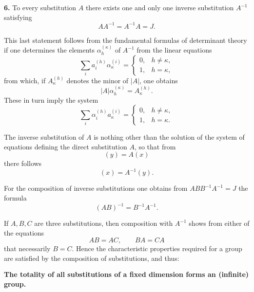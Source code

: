 \documentclass[11pt]{article}
\begin{document}
\medskip
\noindent\textbf{6.}
To every substitution \(A\) there exists one and only one inverse substitution \(A^{-1}\) satisfying
\[
AA^{-1}=A^{-1}A=J.
\tag{15}
\]

\medskip
This last statement follows from the fundamental formulas of determinant theory if one determines the elements \(\alpha^{(\kappa)}_h\) of \(A^{-1}\) from the linear equations
\[
\sum_i a^{(h)}_i\alpha^{(i)}_\kappa=
\begin{cases}
0,& h\ne \kappa,\\
1,& h=\kappa,
\end{cases}
\tag{16}
\]
from which, if \(A^{(h)}_\kappa\) denotes the minor of \(|A|\), one obtains
\[
|A|\alpha^{(\kappa)}_h=A^{(h)}_\kappa.
\tag{17}
\]
These in turn imply the system
\[
\sum_i \alpha^{(h)}_i a^{(i)}_\kappa=
\begin{cases}
0,& h\ne \kappa,\\
1,& h=\kappa.
\end{cases}
\tag{18}
\]

The inverse substitution of \(A\) is nothing other than the solution of the system of equations defining the direct substitution \(A\), so that from
\[
(y)=A(x)
\]
there follows
\[
(x)=A^{-1}(y).
\tag{19}
\]

For the composition of inverse substitutions one obtains from \(ABB^{-1}A^{-1}=J\) the formula
\[
(AB)^{-1}=B^{-1}A^{-1}.
\tag{20}
\]

If \(A,B,C\) are three substitutions, then composition with \(A^{-1}\) shows from either of the equations
\[
AB=AC,\qquad BA=CA
\]
that necessarily \(B=C\). Hence the characteristic properties required for a group are satisfied by the composition of substitutions, and thus:

\medskip
\noindent
\textbf{The totality of all substitutions of a fixed dimension forms an (infinite) group.}
\end{document}
